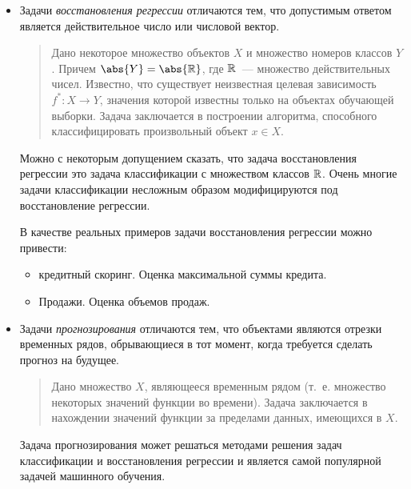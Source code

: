 \begin{itemize}
  \item Задачи \emph{восстановления регрессии} отличаются тем, что допустимым ответом является
    действительное число или числовой вектор.
    
    \begin{quote}
      \vspace*{-1ex}
      Дано некоторое множество объектов \( X \) и множество номеров классов \( Y \). Причем
      \( \abs{Y} = \abs{\RE} \), где \( \mathbb{R} \)~--- множество действительных чисел.
      Известно, что существует неизвестная целевая зависимость \( f^*\colon X\to Y \), значения которой
      известны только на объектах обучающей выборки. Задача заключается в построении алгоритма,
      способного классифицировать произвольный объект \( x\in X \).
      \vspace*{-1ex}
    \end{quote}
    
    Можно с некоторым допущением сказать, что задача восстановления регрессии это задача классификации
    с множеством классов \( \mathbb{R} \). Очень многие задачи классификации несложным образом
    модифицируются под восстановление регрессии.
    
    В качестве реальных примеров задачи восстановления регрессии можно привести:
    \begin{itemize}
      \item кредитный скоринг. Оценка максимальной суммы кредита.
      \item Продажи. Оценка объемов продаж.
    \end{itemize}
    
  \item Задачи \emph{прогнозирования} отличаются тем, что объектами являются отрезки временных рядов,
    обрывающиеся в тот момент, когда требуется сделать прогноз на будущее.
    
    \begin{quote}
      \vspace*{-1ex}
      Дано множество \( X \), являющееся временным рядом (т.~е. множество некоторых значений
      функции во времени). Задача заключается в нахождении значений функции за пределами данных,
      имеющихся в \( X \).
      \vspace*{-1ex}
    \end{quote}
    
    Задача прогнозирования может решаться методами решения задач классификации и восстановления
    регрессии и является самой популярной задачей машинного обучения.
    

\end{itemize}

